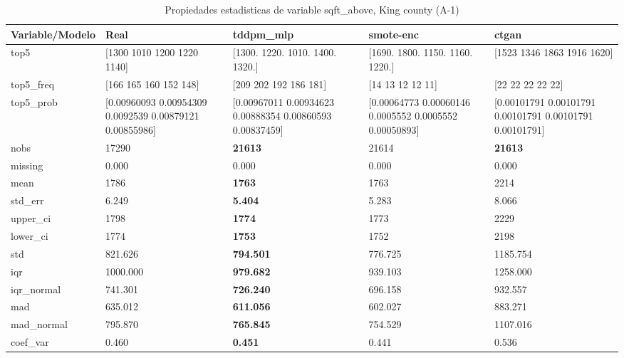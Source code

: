 \begin{table}[H]
\centering
\fontsize{8}{14}\selectfont
\caption{Propiedades  estadisticas de variable sqft\_above, King county (A-1)}
\label{table-stats-king county-a-1-sqft_above}
\begin{tabular}{|l|m{10em}|m{10em}|m{10em}|m{10em}|}
\hline
 \rowcolor[gray]{0.8}
Variable/Modelo & Real & tddpm\_mlp & smote-enc & ctgan \\
\hline top5 & [1300 1010 1200 1220 1140] & [1300. 1220. 1010. 1400. 1320.] & [1690. 1800. 1150. 1160. 1220.] & [1523 1346 1863 1916 1620] \\
\hline top5\_freq & [166 165 160 152 148] & [209 202 192 186 181] & [14 13 12 12 11] & [22 22 22 22 22] \\
\hline top5\_prob & [0.00960093 0.00954309 0.0092539  0.00879121 0.00855986] & [0.00967011 0.00934623 0.00888354 0.00860593 0.00837459] & [0.00064773 0.00060146 0.0005552  0.0005552  0.00050893] & [0.00101791 0.00101791 0.00101791 0.00101791 0.00101791] \\
\hline nobs & 17290 & \bfseries 21613 & \cellcolor[rgb]{0.9, 0.54, 0.52} 21614 & \bfseries 21613 \\
\hline missing & 0.000 & 0.000 & 0.000 & 0.000 \\
\hline mean & 1786 & \bfseries 1763 & 1763 & \cellcolor[rgb]{0.9, 0.54, 0.52} 2214 \\
\hline std\_err & 6.249 & \bfseries 5.404 & 5.283 & \cellcolor[rgb]{0.9, 0.54, 0.52} 8.066 \\
\hline upper\_ci & 1798 & \bfseries 1774 & 1773 & \cellcolor[rgb]{0.9, 0.54, 0.52} 2229 \\
\hline lower\_ci & 1774 & \bfseries 1753 & 1752 & \cellcolor[rgb]{0.9, 0.54, 0.52} 2198 \\
\hline std & 821.626 & \bfseries 794.501 & 776.725 & \cellcolor[rgb]{0.9, 0.54, 0.52} 1185.754 \\
\hline iqr & 1000.000 & \bfseries 979.682 & 939.103 & \cellcolor[rgb]{0.9, 0.54, 0.52} 1258.000 \\
\hline iqr\_normal & 741.301 & \bfseries 726.240 & 696.158 & \cellcolor[rgb]{0.9, 0.54, 0.52} 932.557 \\
\hline mad & 635.012 & \bfseries 611.056 & 602.027 & \cellcolor[rgb]{0.9, 0.54, 0.52} 883.271 \\
\hline mad\_normal & 795.870 & \bfseries 765.845 & 754.529 & \cellcolor[rgb]{0.9, 0.54, 0.52} 1107.016 \\
\hline coef\_var & 0.460 & \bfseries 0.451 & 0.441 & \cellcolor[rgb]{0.9, 0.54, 0.52} 0.536 \\

\end{tabular}
\end{table}
